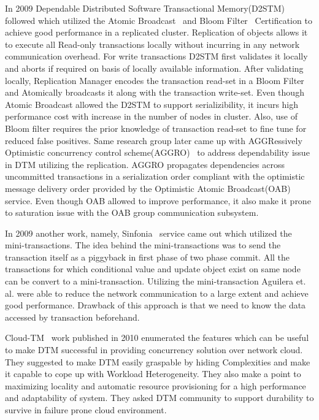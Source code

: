 \documentclass[12pt,english]{report}
\begin{document}
In 2009 Dependable Distributed Software Transactional Memory(D2STM)~\cite{D2STM:5368778} followed which utilized the Atomic Broadcast~\cite{Defago:2004:TOB:1041680.1041682} and Bloom Filter~\cite{Bloom:1970:STH:362686.362692} Certification to achieve good performance in a replicated cluster. Replication of objects allows it to execute all Read-only transactions locally without incurring in any network communication overhead. For write transactions D2STM first validates it locally and aborts if required on basis of locally available information. After validating locally, Replication Manager encodes the transaction read-set in a Bloom Filter and Atomically broadcasts it along with the transaction write-set. Even though Atomic Broadcast allowed the D2STM to support serializibility, it incurs high performance cost with increase in the number of nodes in cluster. Also, use of Bloom filter requires the prior knowledge of transaction read-set to fine tune for reduced false positives. Same research group later came up with AGGRessively Optimistic concurrency control scheme(AGGRO)~\cite{AGGRO:5598236} to address dependability issue in DTM utilizing the replication. AGGRO propagates dependencies across uncommitted transactions in a serialization order compliant with the optimistic message delivery order provided by the Optimistic Atomic Broadcast(OAB)~\cite{OAB:Pedone200379} service. Even though OAB allowed to improve performance, it also make it prone to saturation issue with the OAB group communication subsystem.  

In 2009 another work, namely, Sinfonia~\cite{Aguilera:2009:SNP:1629087.1629088} service came out which utilized the mini-transactions. The idea behind the mini-transactions was to send the transaction itself as a piggyback in first phase of two phase commit. All the transactions for which conditional value and update object exist on same node can be convert to a mini-transaction. Utilizing the mini-transaction Aguilera et. al. were able to reduce the network communication to a large extent and achieve good performance. Drawback of this approach is that we need to know the data accessed by transaction beforehand.

Cloud-TM~\cite{Romano:2010:CHC:1773912.1773914} work published in 2010 enumerated the features which can be useful to make DTM successful in providing concurrency solution over network cloud. They suggested to make DTM easily graspable by hiding Complexities and make it capable to cope up with Workload Heterogeneity. They also make a point to maximizing locality and automatic resource provisioning for a high performance and adaptability of system. They asked DTM community to support durability to survive in failure prone cloud environment. 
\end{document}
